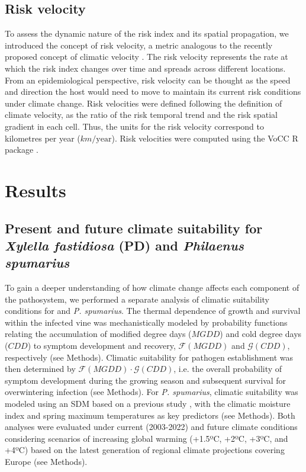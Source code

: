 \subsection{Risk velocity}

To assess the dynamic nature of the risk index and its spatial propagation,
we introduced the concept of risk velocity, a metric analogous to the recently
proposed concept of climatic velocity \cite{Loarie2009}. The risk velocity
represents the rate at which the risk index changes over time and spreads
across different locations. From an epidemiological perspective, risk velocity
can be thought as the speed and direction the host would need to move to
maintain its current risk conditions under climate change. Risk velocities were
defined following the definition of climate velocity, as the ratio of the risk
temporal trend and the risk spatial gradient in each cell. Thus, the units for
the risk velocity correspond to kilometres per year ($km/\mathrm{year}$). Risk
velocities were computed using the VoCC R package \cite{VoCC, VoCC_paper}.

\section{Results}

\subsection{Present and future climate suitability for \textit{Xylella
        fastidiosa} (PD) and \textit{Philaenus spumarius}}

To gain a deeper understanding of how climate change affects each component
of the pathosystem, we performed a separate analysis of climatic suitability
conditions for \xf{} and \textit{P. spumarius}. The thermal dependence of \xf{}
growth and survival within the infected vine was mechanistically modeled by
probability functions relating the accumulation of modified degree days
($MGDD$) and cold degree days ($CDD$) to symptom development and recovery,
$\mathcal{F}(MGDD)$ and $\mathcal{G}(CDD)$, respectively (see Methods).
Climatic suitability for pathogen establishment was then determined by
$\mathcal{F}(MGDD)\cdot\mathcal{G}(CDD)$, i.e. the overall probability of
symptom development during the growing season and subsequent survival for
overwintering infection (see Methods).	For \textit{P. spumarius}, climatic
suitability was modeled using an SDM based on a previous study
\cite{Godefroid2022_vector}, with the climatic moisture index
\cite{willmott_more_1992} and spring maximum temperatures  as key predictors
(see Methods). Both analyses were evaluated under current (2003-2022) and
future climate conditions considering scenarios of increasing global warming
(+1.5ºC, +2ºC, +3ºC, and +4ºC) based on the latest generation of regional
climate projections covering Europe \cite{jacob_regional_2020} (see Methods).

